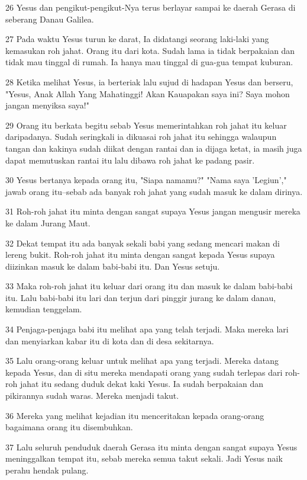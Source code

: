 \par 26 Yesus dan pengikut-pengikut-Nya terus berlayar sampai ke daerah Gerasa di seberang Danau Galilea.
\par 27 Pada waktu Yesus turun ke darat, Ia didatangi seorang laki-laki yang kemasukan roh jahat. Orang itu dari kota. Sudah lama ia tidak berpakaian dan tidak mau tinggal di rumah. Ia hanya mau tinggal di gua-gua tempat kuburan.
\par 28 Ketika melihat Yesus, ia berteriak lalu sujud di hadapan Yesus dan berseru, "Yesus, Anak Allah Yang Mahatinggi! Akan Kauapakan saya ini? Saya mohon jangan menyiksa saya!"
\par 29 Orang itu berkata begitu sebab Yesus memerintahkan roh jahat itu keluar daripadanya. Sudah seringkali ia dikuasai roh jahat itu sehingga walaupun tangan dan kakinya sudah diikat dengan rantai dan ia dijaga ketat, ia masih juga dapat memutuskan rantai itu lalu dibawa roh jahat ke padang pasir.
\par 30 Yesus bertanya kepada orang itu, "Siapa namamu?" "Nama saya 'Legiun'," jawab orang itu--sebab ada banyak roh jahat yang sudah masuk ke dalam dirinya.
\par 31 Roh-roh jahat itu minta dengan sangat supaya Yesus jangan mengusir mereka ke dalam Jurang Maut.
\par 32 Dekat tempat itu ada banyak sekali babi yang sedang mencari makan di lereng bukit. Roh-roh jahat itu minta dengan sangat kepada Yesus supaya diizinkan masuk ke dalam babi-babi itu. Dan Yesus setuju.
\par 33 Maka roh-roh jahat itu keluar dari orang itu dan masuk ke dalam babi-babi itu. Lalu babi-babi itu lari dan terjun dari pinggir jurang ke dalam danau, kemudian tenggelam.
\par 34 Penjaga-penjaga babi itu melihat apa yang telah terjadi. Maka mereka lari dan menyiarkan kabar itu di kota dan di desa sekitarnya.
\par 35 Lalu orang-orang keluar untuk melihat apa yang terjadi. Mereka datang kepada Yesus, dan di situ mereka mendapati orang yang sudah terlepas dari roh-roh jahat itu sedang duduk dekat kaki Yesus. Ia sudah berpakaian dan pikirannya sudah waras. Mereka menjadi takut.
\par 36 Mereka yang melihat kejadian itu menceritakan kepada orang-orang bagaimana orang itu disembuhkan.
\par 37 Lalu seluruh penduduk daerah Gerasa itu minta dengan sangat supaya Yesus meninggalkan tempat itu, sebab mereka semua takut sekali. Jadi Yesus naik perahu hendak pulang.
